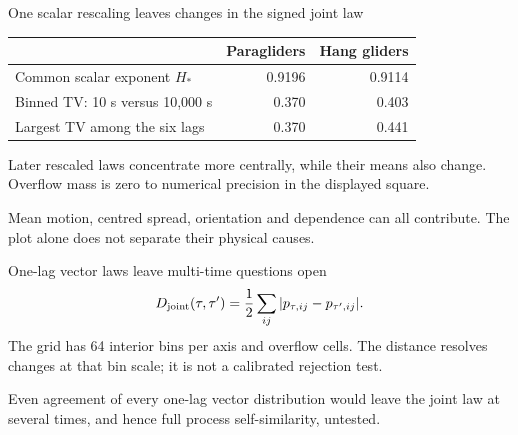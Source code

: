\documentclass[11pt,aspectratio=169]{beamer}
\begin{document}
\begin{frame}{One scalar rescaling leaves changes in the signed joint law}
\small
\begin{center}
\begin{tabular}{@{}lrr@{}}\toprule
 & Paragliders & Hang gliders\\\midrule
Common scalar exponent $H_*$ & 0.9196 & 0.9114\\
Binned TV: 10 s versus 10,000 s & 0.370 & 0.403\\
Largest TV among the six lags & 0.370 & 0.441\\\bottomrule
\end{tabular}
\end{center}
Later rescaled laws concentrate more centrally, while their means also change.
Overflow mass is zero to numerical precision in the displayed square.
\par\medskip
Mean motion, centred spread, orientation and dependence can all contribute.
The plot alone does not separate their physical causes.
\end{frame}

\begin{frame}{One-lag vector laws leave multi-time questions open}
\[
 D_{\rm joint}(\tau,\tau')=\frac12\sum_{ij}|p_{\tau,ij}-p_{\tau',ij}|.
\]
\small
The grid has 64 interior bins per axis and overflow cells. The distance resolves
changes at that bin scale; it is not a calibrated rejection test.
\par\medskip
Even agreement of every one-lag vector distribution would leave the joint law at
several times, and hence full process self-similarity, untested.
\end{frame}
\end{document}

